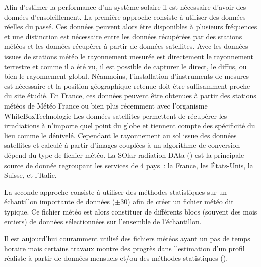 Afin d’estimer la performance d’un système solaire il est nécessaire d’avoir des
données d’ensoleillement. La première approche consiste à utiliser des données réelles
du passé. Ces données peuvent alors être disponibles à plusieurs fréquences et
une distinction est nécessaire entre les données récupérées par des stations météos et les
données récupérer à partir de données satellites. Avec les données issues de stations météo
le rayonnement mesurée est directement le rayonnement
terrestre et comme il a été vu, il est possible de capturer le direct,
le diffus, ou bien le rayonnement global. Néanmoins, l’installation d’instruments de mesures est nécessaire et
la position géographique retenue doit être suffisamment proche du site étudié.
En France, ces données peuvent être obtenues à partir des stations météos de
Météo France ou bien plus récemment avec l’organisme WhiteBoxTechnologie 
Les données satellites permettent de récupérer les irradiations à n’importe quel
point du globe et tiennent compte des spécificité du lieu comme le dénivelé. Cependant
le rayonnement au sol issue des données satellites et calculé à partir d’images couplées
à un algorithme de conversion dépend du type de fichier météo.
La SOlar radiation DAta () est la principale source de donnée regroupant les
services de 4 pays~: la France, les États-Unis, la Suisse, et l’Italie.

La seconde approche consiste à utiliser des méthodes statistiques sur un échantillon
importante de données ($\pm 30$) afin de créer un fichier météo dit typique. Ce fichier
météo est alors constituer de différents blocs (souvent des mois entiers) de données
sélectionnées sur l’ensemble de l’échantillon.


Il est aujourd’hui couramment utilisé des fichiers météos
ayant un pas de temps horaire mais certains travaux montre des progrès dans l’estimation
d’un profil réaliste à partir de données mensuels et/ou des méthodes statistiques
().




